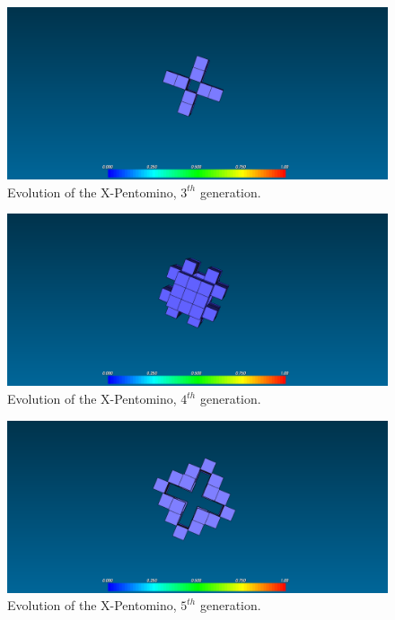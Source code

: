 \begin{figure}
	\centering
	\includegraphics[scale=0.3]{pentominoes_ss/x_3.png}
	\caption{Evolution of the X-Pentomino, $3^{th}$ generation.}
	\label{fig:ss-pent:x-3}
\end{figure}

\begin{figure}
	\centering
	\includegraphics[scale=0.3]{pentominoes_ss/x_4.png}
	\caption{Evolution of the X-Pentomino, $4^{th}$ generation.}
	\label{fig:ss-pent:x-4}
\end{figure}

\begin{figure}
	\centering
	\includegraphics[scale=0.3]{pentominoes_ss/x_5.png}
	\caption{Evolution of the X-Pentomino, $5^{th}$ generation.}
	\label{fig:ss-pent:x-5}
\end{figure}

